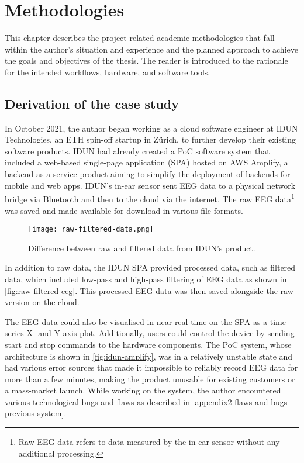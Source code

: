 \chapter{Methodologies}
\graphicspath{{Chapter3/Figs/}{Chapter3/Figs/}}

This chapter describes the project-related academic methodologies that fall within the author’s situation and experience and the planned approach to achieve the goals and objectives of the thesis. The reader is introduced to the rationale for the intended workflows, hardware, and software tools.

\section{Derivation of the case study}
\label{chapter3-derivation-of-the-case-study}

In October 2021, the author began working as a cloud software engineer at IDUN Technologies, an ETH spin-off startup in Zürich, to further develop their existing software products. IDUN had already created a PoC software system that included a web-based single-page application (SPA) hosted on AWS Amplify, a backend-as-a-service product aiming to simplify the deployment of backends for mobile and web apps. IDUN’s in-ear sensor sent EEG data to a physical network bridge via Bluetooth and then to the cloud via the internet. The raw EEG data\footnote{Raw EEG data refers to data measured by the in-ear sensor without any additional processing.} was saved and made available for download in various file formats.

\begin{figure}[!ht]
  \centering
  \texttt{[image: raw-filtered-data.png]}
  \caption{Difference between raw and filtered data from IDUN’s product.}
  \label{fig:raw-filtered-eeg}
\end{figure}

In addition to raw data, the IDUN SPA provided processed data, such as filtered data, which included low-pass and high-pass filtering of EEG data as shown in \autoref{fig:raw-filtered-eeg}. This processed EEG data was then saved alongside the raw version on the cloud.

The EEG data could also be visualised in near-real-time on the SPA as a time-series X- and Y-axis plot. Additionally, users could control the device by sending start and stop commands to the hardware components. The PoC system, whose architecture is shown in \autoref{fig:idun-amplify}, was in a relatively unstable state and had various error sources that made it impossible to reliably record EEG data for more than a few minutes, making the product unusable for existing customers or a mass-market launch. While working on the system, the author encountered various technological bugs and flaws as described in \autoref{appendix2-flaws-and-bugs-previous-system}.

